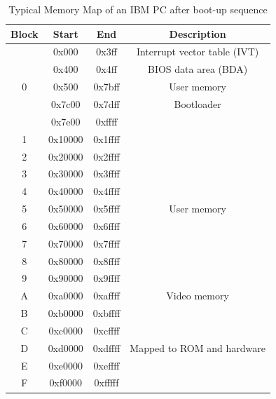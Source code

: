 \begin{table}[H]
\begin{center}
{\normalsize%
\caption{Typical Memory Map of an IBM PC after boot-up sequence}\label{table:memmap}
\begin{tabular}[t]{|c|c|c|c|}
\hline
\textbf{Block} & \textbf{Start} & \textbf{End} & \textbf{Description}\\
\hline
 & 0x000 & 0x3ff & Interrupt vector table (IVT)\\
	\cline{2-4}
  & 0x400 & 0x4ff & BIOS data area (BDA)\\
	\cline{2-4}
0  & 0x500 & 0x7bff & User memory\\
	\cline{2-4}
  & 0x7c00 & 0x7dff & Bootloader\\
	\cline{2-4}
  & 0x7e00 & 0xffff &\\
	\cline{1-3}
1 & 0x10000 & 0x1ffff &\\
	\cline{1-3}
2 & 0x20000 & 0x2ffff &\\
	\cline{1-3}
3 & 0x30000 & 0x3ffff &\\
	\cline{1-3}
4 & 0x40000 & 0x4ffff &\\
	\cline{1-3}
5 & 0x50000 & 0x5ffff & User memory\\
	\cline{1-3}
6 & 0x60000 & 0x6ffff &\\
	\cline{1-3}
7 & 0x70000 & 0x7ffff &\\
	\cline{1-3}
8 & 0x80000 & 0x8ffff &\\
	\cline{1-3}
9 & 0x90000 & 0x9ffff &\\
\hline
A & 0xa0000 & 0xaffff & Video memory\\
	\cline{1-3}
B & 0xb0000 & 0xbffff &\\
\hline
C & 0xc0000 & 0xcffff &\\
	\cline{1-3}
D & 0xd0000 & 0xdffff & Mapped to ROM and hardware\\
	\cline{1-3}
E & 0xe0000 & 0xeffff &\\
	\cline{1-3}
F & 0xf0000 & 0xfffff &\\
\hline
\end{tabular}}
\end{center}
\end{table}


